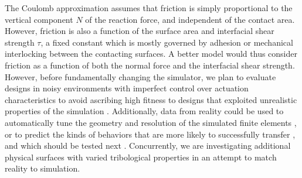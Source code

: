 The Coulomb approximation assumes that friction is simply proportional to the vertical component $N$ of the reaction force, and independent of the contact area. 
However, friction is also a function of the surface area and interfacial shear strength $\tau$, a fixed constant which is mostly governed by adhesion or mechanical interlocking between the contacting surfaces. 
A better model would thus consider friction as a function of both the normal force and the interfacial shear strength.
However, before fundamentally changing the simulator,
we plan to evaluate designs in noisy environments with imperfect control over actuation characteristics to avoid ascribing high fitness to designs that exploited unrealistic properties of the simulation \cite{jakobi1995noise}.
Additionally, data from reality could be used to automatically tune  the geometry and resolution of the simulated finite elements \cite{bongard2006resilient}, or to predict the kinds of behaviors that are more likely to successfully transfer \cite{koos2012transferability}, and which should be tested next \cite{bongard2006resilient}. 
Concurrently, we are investigating additional physical surfaces with varied tribological properties in an attempt to match reality to simulation.







